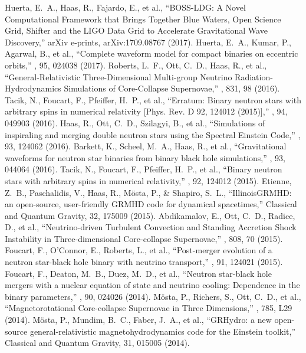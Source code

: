 Huerta, E.~A., Haas, R., Fajardo, E., et al., ``BOSS-LDG: A Novel Computational Framework that Brings Together Blue Waters, Open Science Grid, Shifter and the LIGO Data Grid to Accelerate Gravitational Wave Discovery,'' arXiv e-prints, arXiv:1709.08767 (2017).
 Huerta, E.~A., Kumar, P., Agarwal, B., et al., ``Complete waveform model for compact binaries on eccentric orbits,'' \prd, 95, 024038 (2017).
 Roberts, L.~F., Ott, C.~D., Haas, R., et al., ``General-Relativistic Three-Dimensional Multi-group Neutrino Radiation-Hydrodynamics Simulations of Core-Collapse Supernovae,'' \apj, 831, 98 (2016).
 Tacik, N., Foucart, F., Pfeiffer, H.~P., et al., ``Erratum: Binary neutron stars with arbitrary spins in numerical relativity [Phys. Rev. D 92, 124012 (2015)],'' \prd, 94, 049903 (2016).
 Haas, R., Ott, C.~D., Szilagyi, B., et al., ``Simulations of inspiraling and merging double neutron stars using the Spectral Einstein Code,'' \prd, 93, 124062 (2016).
 Barkett, K., Scheel, M.~A., Haas, R., et al., ``Gravitational waveforms for neutron star binaries from binary black hole simulations,'' \prd, 93, 044064 (2016).
 Tacik, N., Foucart, F., Pfeiffer, H.~P., et al., ``Binary neutron stars with arbitrary spins in numerical relativity,'' \prd, 92, 124012 (2015).
 Etienne, Z.~B., Paschalidis, V., Haas, R., M{\"o}sta, P., \& Shapiro, S.~L., ``IllinoisGRMHD: an open-source, user-friendly GRMHD code for dynamical spacetimes,'' Classical and Quantum Gravity, 32, 175009 (2015).
 Abdikamalov, E., Ott, C.~D., Radice, D., et al., ``Neutrino-driven Turbulent Convection and Standing Accretion Shock Instability in Three-dimensional Core-collapse Supernovae,'' \apj, 808, 70 (2015).
 Foucart, F., O'Connor, E., Roberts, L., et al., ``Post-merger evolution of a neutron star-black hole binary with neutrino transport,'' \prd, 91, 124021 (2015).
 Foucart, F., Deaton, M.~B., Duez, M.~D., et al., ``Neutron star-black hole mergers with a nuclear equation of state and neutrino cooling: Dependence in the binary parameters,'' \prd, 90, 024026 (2014).
 M{\"o}sta, P., Richers, S., Ott, C.~D., et al., ``Magnetorotational Core-collapse Supernovae in Three Dimensions,'' \apjl, 785, L29 (2014).
 M{\"o}sta, P., Mundim, B.~C., Faber, J.~A., et al., ``GRHydro: a new open-source general-relativistic magnetohydrodynamics code for the Einstein toolkit,'' Classical and Quantum Gravity, 31, 015005 (2014).
